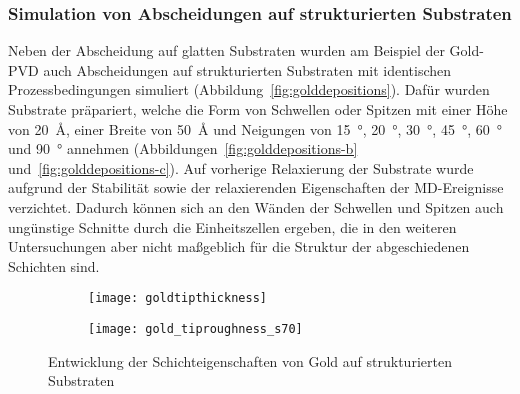 \subsubsection{Simulation von Abscheidungen auf strukturierten Substraten}

Neben der Abscheidung auf glatten Substraten wurden am Beispiel der Gold-PVD auch Abscheidungen auf strukturierten Substraten mit identischen Prozessbedingungen simuliert (Abbildung~\ref{fig:golddepositions}).
Dafür wurden Substrate präpariert, welche die Form von Schwellen oder Spitzen mit einer Höhe von \SI{20}{\angstrom}, einer Breite von \SI{50}{\angstrom} und Neigungen von \SI{15}{\degree}, \SI{20}{\degree}, \SI{30}{\degree}, \SI{45}{\degree}, \SI{60}{\degree} und \SI{90}{\degree} annehmen (Abbildungen~\ref{fig:golddepositions-b} und~\ref{fig:golddepositions-c}).
Auf vorherige Relaxierung der Substrate wurde aufgrund der Stabilität sowie der relaxierenden Eigenschaften der MD-Ereignisse verzichtet.
Dadurch können sich an den Wänden der Schwellen und Spitzen auch ungünstige Schnitte durch die Einheitszellen ergeben, die in den weiteren Untersuchungen aber nicht maßgeblich für die Struktur der abgeschiedenen Schichten sind.

\begin{figure}[t]
  \captionsetup[subfigure]{singlelinecheck=false}
  \def\subfigwidth{0.49\textwidth}

  \begin{subfigure}[t]{\subfigwidth}
    \texttt{[image: goldtipthickness]}
    \label{fig:goldrough-a}
  \end{subfigure}
  \hfill
  \begin{subfigure}[t]{\subfigwidth}
    \texttt{[image: gold\_tiproughness\_s70]}
    \label{fig:goldrough-b}
  \end{subfigure}

  \caption[Schichteigenschaften von Gold auf strukturierten Substraten]{
    Entwicklung der Schichteigenschaften von Gold auf strukturierten Substraten
  }
  \label{fig:goldrough}

\end{figure}

